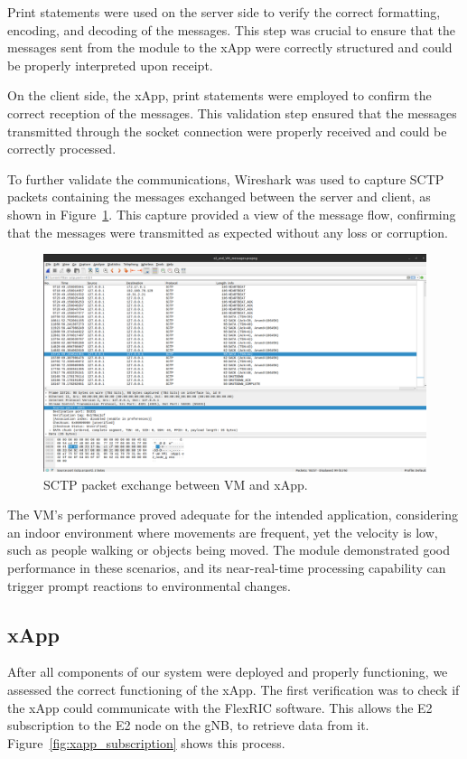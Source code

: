Print statements were used on the server side to verify the correct formatting, encoding, and decoding of the messages.
This step was crucial to ensure that the messages sent from the module to the xApp were correctly structured and could be properly interpreted upon receipt.

On the client side, the xApp, print statements were employed to confirm the correct reception of the messages.
This validation step ensured that the messages transmitted through the socket connection were properly received and could be correctly processed.

To further validate the communications, Wireshark was used to capture SCTP packets containing the messages exchanged between the server and client, as shown in Figure~\ref{fig:capture_messages}.
This capture provided a view of the message flow, confirming that the messages were transmitted as expected without any loss or corruption.

\begin{figure}[H]
    \centering
    \includegraphics[width=0.8\linewidth]{figures/vm_xapp}
    \caption[SCTP packet exchange between VM and xApp]{SCTP packet exchange between VM and xApp.}
    \label{fig:capture_messages}
\end{figure}

The VM's performance proved adequate for the intended application, considering an indoor environment where movements are frequent, yet the velocity is low, such as people walking or objects being moved.
The module demonstrated good performance in these scenarios, and its near-real-time processing capability can trigger prompt reactions to environmental changes.

\subsection{xApp}\label{subsec:mm_xapp}
After all components of our system were deployed and properly functioning, we assessed the correct functioning of the xApp.
The first verification was to check if the xApp could communicate with the FlexRIC software.
This allows the E2 subscription to the E2 node on the gNB, to retrieve data from it.
Figure~\ref{fig:xapp_subscription} shows this process.

